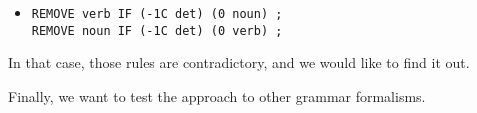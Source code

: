 \begin{itemize}
\item[] \begin{verbatim}
REMOVE verb IF (-1C det) (0 noun) ;
REMOVE noun IF (-1C det) (0 verb) ;
\end{verbatim}
\end{itemize}

In that case, those rules are contradictory, and we would like to find it out.

Finally, we want to test the approach to other grammar formalisms.




